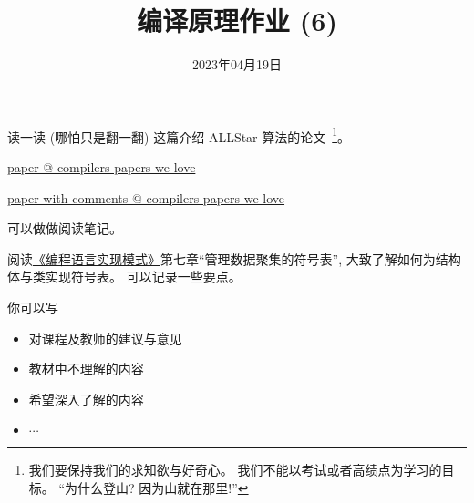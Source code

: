 \documentclass[a4paper, justified]{tufte-handout}
\title{编译原理作业 (6)}
\date{2023年04月19日}
\begin{document}
\maketitle
\noplagiarism %
\begin{abstract}
\end{abstract}
\beginrequired

\begin{problem}
  读一读 (哪怕只是翻一翻) 这篇介绍 ALLStar 算法的论文~\footnote{
    我们要保持我们的求知欲与好奇心。
    我们不能以考试或者高绩点为学习的目标。
    ``为什么登山? 因为山就在那里!''
  }。

  \noindent\href{https://github.com/courses-at-nju-by-hfwei/compilers-papers-we-love/blob/master/parsing/PLDI2014\%20Adaptive\%20LL(Star)\%20Parsing\%20The\%20Power\%20of\%20Dynamic\%20Analysis\%20(ALLStar).pdf}{paper @ compilers-papers-we-love}

	\noindent\href{https://github.com/courses-at-nju-by-hfwei/compilers-papers-we-love/blob/master/parsing/PLDI2014\%20Adaptive\%20LL(Star)\%20Parsing\%20The\%20Power\%20of\%20Dynamic\%20Analysis\%20(ALLStar)-Comments.pdf}{paper with comments @ compilers-papers-we-love}

  \noindent 可以做做阅读笔记。
\end{problem}

\begin{solution}
\end{solution}


\begin{problem}
  阅读\href{https://github.com/courses-at-nju-by-hfwei/compilers-resources/blob/master/books/ANTLR/\%E7\%BC\%96\%E7\%A8\%8B\%E8\%AF\%AD\%E8\%A8\%80\%E5\%AE\%9E\%E7\%8E\%B0\%E6\%A8\%A1\%E5\%BC\%8F.pdf}{《编程语言实现模式》}第七章``管理数据聚集的符号表'',
  大致了解如何为结构体与类实现符号表。
  可以记录一些要点。
\end{problem}

\begin{solution}
\end{solution}



\beginfb

你可以写
\begin{itemize}
  \item 对课程及教师的建议与意见
  \item 教材中不理解的内容
  \item 希望深入了解的内容
  \item $\cdots$
\end{itemize}
\end{document}
